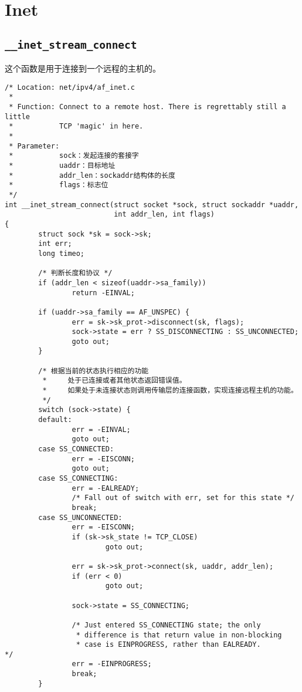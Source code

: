\section{Inet}

\subsection{\texttt{__inet_stream_connect}}
这个函数是用于连接到一个远程的主机的。
\begin{verbatim}
/* Location: net/ipv4/af_inet.c
 *
 * Function: Connect to a remote host. There is regrettably still a little
 *           TCP 'magic' in here.
 *
 * Parameter: 
 *           sock：发起连接的套接字
 *           uaddr：目标地址
 *           addr_len：sockaddr结构体的长度
 *           flags：标志位
 */
int __inet_stream_connect(struct socket *sock, struct sockaddr *uaddr,
                          int addr_len, int flags)
{
        struct sock *sk = sock->sk;
        int err;
        long timeo;

        /* 判断长度和协议 */
        if (addr_len < sizeof(uaddr->sa_family))
                return -EINVAL;

        if (uaddr->sa_family == AF_UNSPEC) {
                err = sk->sk_prot->disconnect(sk, flags);
                sock->state = err ? SS_DISCONNECTING : SS_UNCONNECTED;
                goto out;
        }

        /* 根据当前的状态执行相应的功能
         *     处于已连接或者其他状态返回错误值。
         *     如果处于未连接状态则调用传输层的连接函数，实现连接远程主机的功能。
         */
        switch (sock->state) {
        default:
                err = -EINVAL;
                goto out;
        case SS_CONNECTED:
                err = -EISCONN;
                goto out;
        case SS_CONNECTING:
                err = -EALREADY;
                /* Fall out of switch with err, set for this state */
                break;
        case SS_UNCONNECTED:
                err = -EISCONN;
                if (sk->sk_state != TCP_CLOSE)
                        goto out;

                err = sk->sk_prot->connect(sk, uaddr, addr_len);
                if (err < 0)
                        goto out;

                sock->state = SS_CONNECTING;

                /* Just entered SS_CONNECTING state; the only
                 * difference is that return value in non-blocking
                 * case is EINPROGRESS, rather than EALREADY.
*/
                err = -EINPROGRESS;
                break;
        }


\end{verbatim}
